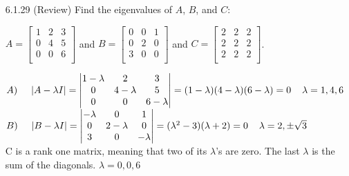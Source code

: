 \documentclass[10pt,twoside,reqno]{article}
\begin{document}
\begin{enumerate}
\vspace{3mm}
\item[6.1.29] (Review) Find the eigenvalues of $A$, $B$, and $C$: \\
\begin{center}
$
A=
\begin{bmatrix}
1&2&3\\
0&4&5\\
0&0&6\\
\end{bmatrix}
$
\hspace{5mm} and \hspace{5mm}
$
B=
\begin{bmatrix}
0&0&1\\
0&2&0\\
3&0&0\\
\end{bmatrix}
$
\hspace{5mm} and \hspace{5mm}
$
C=
\begin{bmatrix}
2&2&2\\
2&2&2\\
2&2&2\\
\end{bmatrix}
$. \\
\end{center}
\vspace{2mm}
\begin{center}
$
A)\hspace{5mm}
|A-\lambda I|=
\begin{vmatrix}
1-\lambda&2&3\\
0&4-\lambda&5\\
0&0&6-\lambda\\
\end{vmatrix}
=(1-\lambda)(4-\lambda)(6-\lambda)=0
\hspace{4mm} \lambda=1,4,6
$ \\ \vspace{2mm}
$
B)\hspace{5mm}
|B-\lambda I|=
\begin{vmatrix}
-\lambda&0&1\\
0&2-\lambda&0\\
3&0&-\lambda\\
\end{vmatrix}
=(\lambda^2-3)(\lambda+2)=0
\hspace{4mm} \lambda=2,\pm\sqrt{3}
$ \\ \vspace{2mm}
C is a rank one matrix, meaning that two of its $\lambda$'s are zero. The last $\lambda$ is the sum of the diagonals.
\hspace{6mm} $\lambda=0,0,6$ \\
\end{center}

\vspace{3mm}
\end{enumerate}
\end{document}
